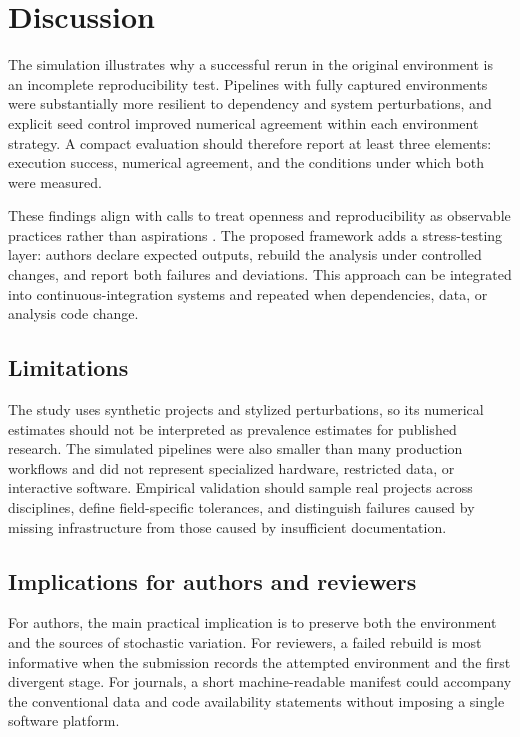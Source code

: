 \section{Discussion}

The simulation illustrates why a successful rerun in the original environment
is an incomplete reproducibility test. Pipelines with fully captured environments
were substantially more resilient to dependency and system perturbations, and
explicit seed control improved numerical agreement within each environment
strategy. A compact evaluation should therefore report at least three elements:
execution success, numerical agreement, and the conditions under which both were
measured.

These findings align with calls to treat openness and reproducibility as
observable practices rather than aspirations \citep{nosek2015}. The proposed
framework adds a stress-testing layer: authors declare expected outputs, rebuild
the analysis under controlled changes, and report both failures and deviations.
This approach can be integrated into continuous-integration systems and repeated
when dependencies, data, or analysis code change.

\subsection{Limitations}

The study uses synthetic projects and stylized perturbations, so its numerical
estimates should not be interpreted as prevalence estimates for published
research. The simulated pipelines were also smaller than many production
workflows and did not represent specialized hardware, restricted data, or
interactive software. Empirical validation should sample real projects across
disciplines, define field-specific tolerances, and distinguish failures caused by
missing infrastructure from those caused by insufficient documentation.

\subsection{Implications for authors and reviewers}

For authors, the main practical implication is to preserve both the environment
and the sources of stochastic variation. For reviewers, a failed rebuild is most
informative when the submission records the attempted environment and the first
divergent stage. For journals, a short machine-readable manifest could accompany
the conventional data and code availability statements without imposing a
single software platform.
